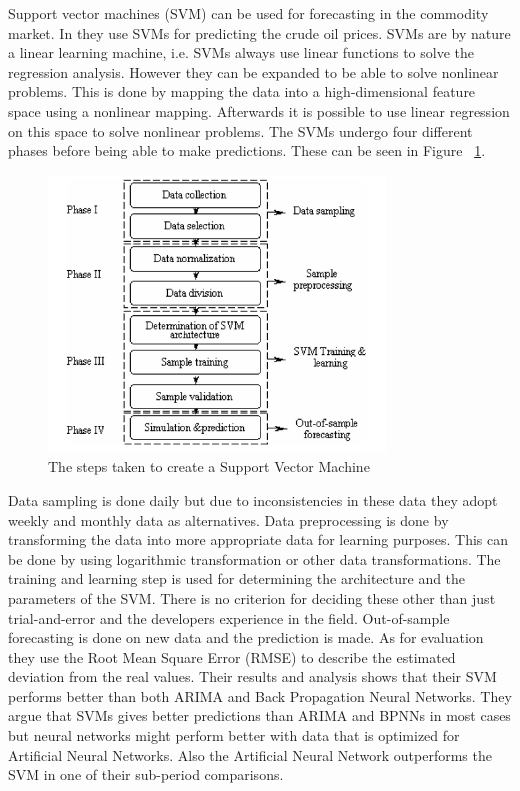 Support vector machines (SVM) can be used for forecasting in the commodity market. In \cite{xie2006new} they use SVMs for predicting the crude oil prices. SVMs are by nature a linear learning machine, i.e. SVMs always use linear functions to solve the regression analysis. However they can be expanded to be able to solve nonlinear problems. This is done by mapping the data into a high-dimensional feature space using a nonlinear mapping. Afterwards it is possible to use linear regression on this space to solve nonlinear problems. The SVMs undergo four different phases before being able to make predictions. These can be seen in Figure ~\ref{fig:phasesOfSVM}.
\begin{figure}[weight!]
\centering
\includegraphics[width=0.8\textwidth ,natwidth=410,natheight=237]{billeder/phases_of_SVM.png}
\caption{The steps taken to create a Support Vector Machine}
\label{fig:phasesOfSVM}
\end{figure}
Data sampling is done daily but due to inconsistencies in these data they adopt weekly and monthly data as alternatives. Data preprocessing is done by transforming the data into more appropriate data for learning purposes. This can be done by using logarithmic transformation or other data transformations. The training and learning step is used for determining the architecture and the parameters of the SVM. There is no criterion for deciding these other than just trial-and-error and the developers experience in the field. Out-of-sample forecasting is done on new data and the prediction is made. As for evaluation they use the Root Mean Square Error (RMSE) to describe the estimated deviation from the real values. Their results and analysis shows that their SVM performs better than both ARIMA and Back Propagation Neural Networks. They argue that SVMs gives better predictions than ARIMA and BPNNs in most cases but neural networks might perform better with data that is optimized for Artificial Neural Networks. Also the Artificial Neural Network outperforms the SVM in one of their sub-period comparisons.

